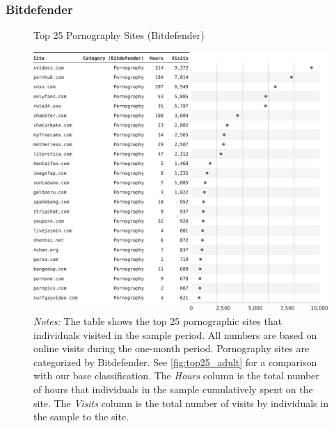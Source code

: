 \documentclass[12pt,twoside]{article}
\begin{document}
\subsubsection{Bitdefender}
\begin{figure}[!ht]
	\centering
	\caption{Top 25 Pornography Sites (Bitdefender)}
	\includegraphics[width=\textwidth]{figs/top_25_adultsites_bitdefender.pdf}
	\caption*{\footnotesize \emph{Notes:} 
		The table shows the top 25 pornographic sites that individuals visited in the sample period.
            All numbers are based on online visits during the one-month period.
		Pornography sites are categorized by Bitdefender.
            See \cref{fig:top25_adult} for a comparison with our base classification.
    	The \emph{Hours} column is the total number of hours that individuals in the sample cumulatively spent on the site. 
    	The \emph{Visits} column is the total number of visits by individuals in the sample to the site.            
	}
	\label{fig:top25_adult_bitdefender}
\end{figure}





\end{document}
